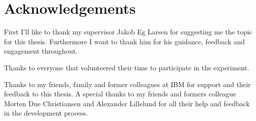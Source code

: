 \chapter{Acknowledgements}

First I'll like to thank my supervisor Jakob Eg Larsen for suggesting me the topic for this thesis. Furthermore I want to thank him for his guidance, feedback and engagement throughout.

Thanks to everyone that volunteered their time to participate in the experiment.

Thanks to my friends, family and former colleagues at IBM for support and their feedback to this thesis. A special thanks to my friends and formers colleague Morten Due Christiansen and Alexander Lillelund for all their help and feedback in the development process.